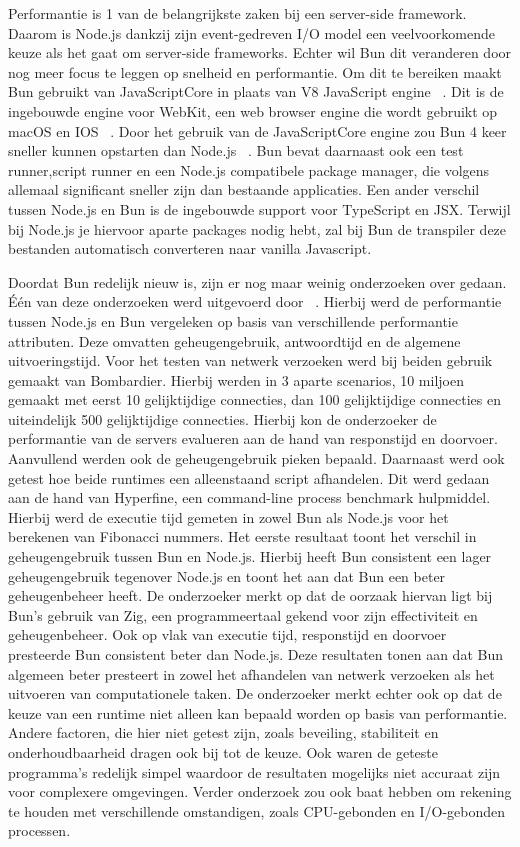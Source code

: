 Performantie is 1 van de belangrijkste zaken bij een server-side framework. Daarom is Node.js dankzij zijn 
event-gedreven I/O model een veelvoorkomende keuze als het gaat om server-side frameworks. 
Echter wil Bun dit veranderen door nog meer focus te leggen op snelheid en performantie. 
Om dit te bereiken maakt Bun gebruikt van JavaScriptCore in plaats van V8 JavaScript engine ~\autocite{McDonnel2023}.
Dit is de ingebouwde engine voor WebKit, een web browser engine die wordt gebruikt op macOS en IOS ~\autocite{Pizlo2020}.
Door het gebruik van de JavaScriptCore engine zou Bun 4 keer sneller kunnen opstarten dan Node.js ~\autocite{McDonnel2023}.
Bun bevat daarnaast ook een test runner,script runner en een Node.js compatibele package manager, die volgens ~\textcite{McDonnel2023} 
allemaal significant sneller zijn dan bestaande applicaties.
Een ander verschil tussen Node.js en Bun is de ingebouwde support voor TypeScript en JSX. 
Terwijl bij Node.js je hiervoor aparte packages nodig hebt, 
zal bij Bun de transpiler deze bestanden automatisch converteren naar vanilla Javascript.

Doordat Bun redelijk nieuw is, zijn er nog maar weinig onderzoeken over gedaan.
Één van deze onderzoeken werd uitgevoerd door ~\textcite{Feroj2023}.
Hierbij werd de performantie tussen Node.js en Bun vergeleken op basis van verschillende performantie attributen. 
Deze omvatten geheugengebruik, antwoordtijd en de algemene uitvoeringstijd. 
Voor het testen van netwerk verzoeken werd bij beiden gebruik gemaakt van Bombardier. Hierbij werden in 3 aparte scenarios, 
10 miljoen gemaakt met eerst 10 gelijktijdige connecties, dan 100 gelijktijdige connecties en
uiteindelijk 500 gelijktijdige connecties. Hierbij kon de onderzoeker de performantie van de servers evalueren 
aan de hand van responstijd en doorvoer. Aanvullend werden ook de geheugengebruik pieken bepaald.
Daarnaast werd ook getest hoe beide runtimes een alleenstaand script afhandelen. 
Dit werd gedaan aan de hand van Hyperfine, een command-line process benchmark hulpmiddel. 
Hierbij werd de executie tijd gemeten in zowel Bun als Node.js voor het berekenen van Fibonacci nummers.
Het eerste resultaat toont het verschil in geheugengebruik tussen Bun en Node.js. 
Hierbij heeft Bun consistent een lager geheugengebruik tegenover Node.js en toont het aan dat Bun een beter geheugenbeheer heeft.
De onderzoeker merkt op dat de oorzaak hiervan ligt bij Bun's gebruik van Zig, 
een programmeertaal gekend voor zijn effectiviteit en geheugenbeheer. 
Ook op vlak van executie tijd, responstijd en doorvoer presteerde Bun consistent beter dan Node.js. 
Deze resultaten tonen aan dat Bun algemeen beter presteert in zowel het afhandelen van netwerk verzoeken 
als het uitvoeren van computationele taken.
De onderzoeker merkt echter ook op dat de keuze van een runtime niet alleen kan bepaald worden op basis van performantie. 
Andere factoren, die hier niet getest zijn, zoals beveiling, stabiliteit en onderhoudbaarheid dragen ook bij tot de keuze. 
Ook waren de geteste programma's redelijk simpel waardoor de resultaten mogelijks niet accuraat zijn voor complexere omgevingen.
Verder onderzoek zou ook baat hebben om rekening te houden met verschillende omstandigen, 
zoals CPU-gebonden en I/O-gebonden processen.

